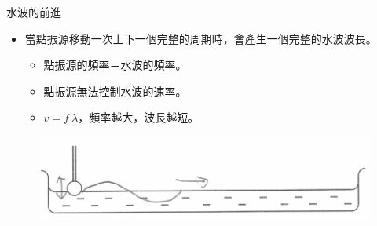\documentclass[13pt]{beamer}
\begin{document}
\begin{frame}{水波的前進}
    \begin{itemize}
        \item 當點振源移動一次上下一個完整的周期時，會產生一個完整的水波波長。\begin{itemize}
                  \item 點振源的頻率＝水波的頻率。
                  \item 點振源無法控制水波的速率。
                  \item $v=f\ \lambda$，頻率越大，波長越短。
              \end{itemize}
    \end{itemize}
    \begin{figure}
        \centering
        \includegraphics[width=0.5\linewidth]{images/Screenshot 2023-09-25 at 2.25.17 AM.png}
    \end{figure}
\end{frame}
\end{document}
